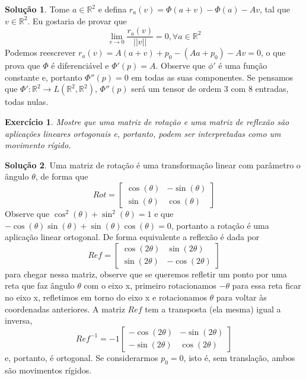\documentclass[a4paper,12pt]{article}
\newcommand{\R}{\mathbb{R}}
\theoremstyle{exer}
\newtheorem{exercise}{Exercício}
\theoremstyle{definition}
\newtheorem{solution}{Solução}
\theoremstyle{plain}
\begin{document}
\begin{solution}
    Tome $a \in \R^2$ e defina $r_a(v) = \Phi(a + v) - \Phi(a) - Av$, tal que
    $v \in \R^2$. Eu gostaria de provar que 
    $$
    \lim_{v \to 0} \frac{r_a(v)}{||v||} = 0, \forall a \in \R^2
    $$
    Podemos reescrever $r_a(v) = A(a + v) + p_0 - (Aa + p_0) - Av = 0$, o que
    prova que $\Phi$ é diferenciável e $\Phi '(p) = A$. Observe que $\phi '$ é
    uma função constante e, portanto $\Phi ''(p) = 0$ em todas as suas
    componentes. Se pensamos que $\Phi ' : \R^2 \to L(\R^2, \R^2)$, $\Phi
    ''(p)$ será um tensor de ordem 3 com 8 entradas, todas nulas. 
    
\end{solution}

\begin{exercise}
    Mostre que uma matriz de rotação e uma matriz de reflexão são aplicações
    lineares ortogonais e, portanto, podem ser interpretadas como um movimento
    rígido.
\end{exercise}

\begin{solution}
    Uma matriz de rotação é uma transformação linear com parâmetro o ângulo
    $\theta$, de forma que 
    $$
    Rot = \begin{bmatrix}
        \cos(\theta) & -\sin(\theta) \\
        \sin(\theta) & \cos(\theta)
    \end{bmatrix}
    $$
    Observe que $\cos^2(\theta) + \sin^2(\theta) = 1$ e que
    $-\cos(\theta)\sin(\theta) + \sin(\theta)\cos(\theta) = 0$, portanto a
    rotação é uma aplicação linear ortogonal. De forma equivalente a reflexão
    é dada por 
    $$
    Ref = \begin{bmatrix}
        \cos(2\theta) & \sin(2\theta) \\
        \sin(2\theta) & -\cos(2\theta)
    \end{bmatrix}
    $$
    para chegar nessa matriz, observe que se queremos refletir um ponto por
    uma reta que faz ângulo $\theta$ com o eixo x, primeiro rotacionamos
    $-\theta$ para essa reta ficar no eixo x, refletimos em torno do eixo x e
    rotacionamos $\theta$ para voltar às coordenadas anteriores. A matriz
    $Ref$ tem a transposta (ela mesma) igual a inversa, 
    $$
    Ref^{-1} =  -1\begin{bmatrix}
        -\cos(2\theta) & -\sin(2\theta) \\
        -\sin(2\theta) & \cos(2\theta)
    \end{bmatrix}
    $$
    e, portanto, é ortogonal. Se considerarmos $p_0 = 0$, isto é, sem
    translação, ambos são movimentos rígidos. 
\end{solution}
\end{document}
